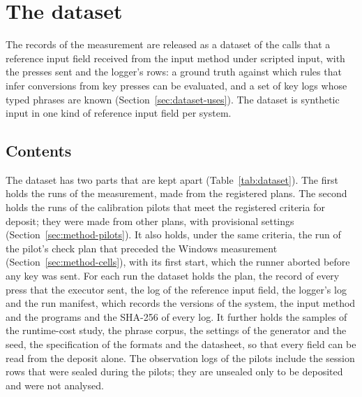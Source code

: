 
\section{The dataset}
\label{sec:dataset}

The records of the measurement are released as a dataset of the calls that a reference input field received from the
input method under scripted input, with the presses sent and the logger's rows: a ground truth against which rules
that infer conversions from key presses can be evaluated, and a set of key logs whose typed phrases are known
(Section~\ref{sec:dataset-uses}). The dataset is synthetic input in one kind of reference input field per system.

\subsection{Contents}
\label{sec:dataset-contents}

The dataset has two parts that are kept apart (Table~\ref{tab:dataset}). The first holds the runs of the measurement,
made from the registered plans. The second holds the runs of the calibration pilots that meet the registered criteria
for deposit; they were made from other plans, with provisional settings (Section~\ref{sec:method-pilots}). It also
holds, under the same criteria, the run of the pilot's check plan that preceded the Windows measurement
(Section~\ref{sec:method-cells}), with its first start, which the runner aborted before any key was sent. For each run
the dataset holds the plan, the record of every press that the executor
sent, the log of the reference input field, the logger's log and the run manifest, which records the versions of the
system, the input method and the programs and the SHA-256 of every log. It further holds the samples of the
runtime-cost study, the phrase corpus, the settings of the generator and the seed, the specification of the formats and
the datasheet, so that every field can be read from the deposit alone. The observation logs of the pilots include the
session rows that were sealed during the pilots; they are unsealed only to be deposited and were not analysed.

